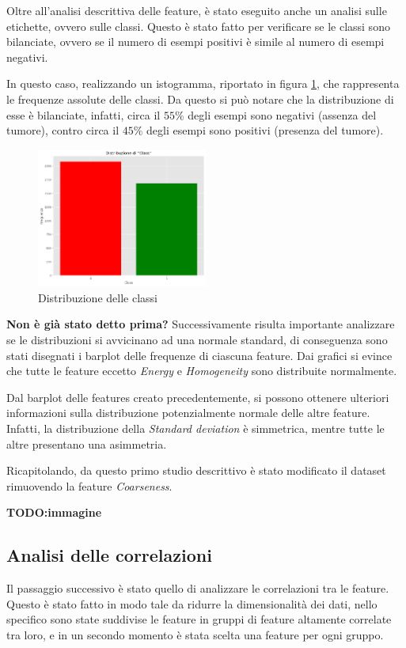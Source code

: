 Oltre all'analisi descrittiva delle feature, è stato eseguito anche un analisi
sulle etichette, ovvero sulle classi. Questo è stato fatto per verificare se le
classi sono bilanciate, ovvero se il numero di esempi positivi è simile al numero
di esempi negativi.

In questo caso, realizzando un istogramma, riportato in figura \ref{fig:dist-classi},
che rappresenta le frequenze assolute delle classi. Da questo si può notare che
la distribuzione di esse è bilanciate, infatti, circa il $55\%$ degli esempi sono
negativi (assenza del tumore), contro circa il $45\%$ degli esempi sono positivi
(presenza del tumore).

\begin{figure}[!ht]
      \centering
      \includegraphics[width=0.5\textwidth]{img/analisi/distribuzioneClassi.png}
      \caption{Distribuzione delle classi}
      \label{fig:dist-classi}
\end{figure}

\textbf{Non è già stato detto prima?}
Successivamente risulta importante analizzare se le distribuzioni si avvicinano
ad una normale standard, di conseguenza sono stati disegnati i barplot delle frequenze
di ciascuna feature. Dai grafici si evince che tutte le feature eccetto \textit{Energy} e
\textit{Homogeneity} sono distribuite normalmente.

Dal barplot delle features creato precedentemente, si possono ottenere ulteriori
informazioni sulla distribuzione potenzialmente normale delle altre feature. Infatti,
la distribuzione della \textit{Standard deviation} è simmetrica, mentre tutte
le altre presentano una asimmetria.

Ricapitolando, da questo primo studio descrittivo è stato modificato il dataset
rimuovendo la feature \textit{Coarseness}.

\textbf{TODO:immagine}

\subsection{Analisi delle correlazioni}
Il passaggio successivo è  stato quello di analizzare le correlazioni tra le feature.
Questo è stato fatto in modo tale da ridurre la dimensionalità dei dati, nello
specifico sono state suddivise le feature in gruppi di feature altamente correlate
tra loro, e in un secondo momento è stata scelta una feature per ogni gruppo.

